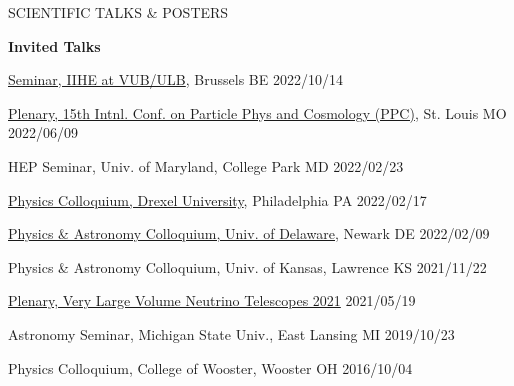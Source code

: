 \documentclass{resume} %
\begin{document}
\begin{rSection}{SCIENTIFIC TALKS \& POSTERS}

{\bf Invited Talks}
\begin{etaremune}

\item \href{https://indico.iihe.ac.be/event/1620/}{Seminar, IIHE at VUB/ULB}, Brussels BE  \hfill 2022/10/14

\item \href{https://indico.cern.ch/event/1126527/contributions/4818939/}{Plenary, 15th Intnl. Conf. on Particle Phys and Cosmology (PPC)}, St. Louis MO  \hfill 2022/06/09

\item HEP Seminar, Univ. of Maryland, College Park MD \hfill 2022/02/23

\item \href{https://drexel.edu/coas/news-events/events-calendar/details/?eid=35304&iid=93965}{Physics Colloquium, Drexel University}, Philadelphia PA  \hfill 2022/02/17

\item \href{https://web.physics.udel.edu/events/colloquium/colloquium-brian-clark}{Physics \& Astronomy Colloquium, Univ. of Delaware}, Newark DE \hfill 2022/02/09

\item Physics \& Astronomy Colloquium, Univ. of Kansas, Lawrence KS \hfill 2021/11/22

\item \href{https://indico.ific.uv.es/event/3965/contributions/14963/}{Plenary, Very Large Volume Neutrino Telescopes 2021} \hfill 2021/05/19

\item Astronomy Seminar, Michigan State Univ., East Lansing MI \hfill 2019/10/23

\item Physics Colloquium, College of Wooster, Wooster OH \hfill 2016/10/04

\end{etaremune}


\end{rSection}
\end{document}
